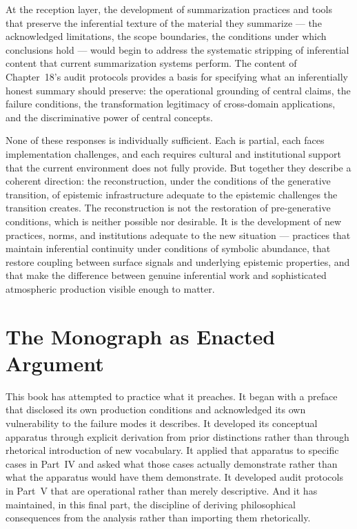 \documentclass[12pt, openright, twoside]{book}
\begin{document}
At the reception layer, the development of summarization practices
and tools that preserve the inferential texture of the material they
summarize --- the acknowledged limitations, the scope boundaries, the
conditions under which conclusions hold --- would begin to address the
systematic stripping of inferential content that current summarization
systems perform. The content of Chapter~18's audit protocols provides
a basis for specifying what an inferentially honest summary should
preserve: the operational grounding of central claims, the failure
conditions, the transformation legitimacy of cross-domain applications,
and the discriminative power of central concepts.

None of these responses is individually sufficient. Each is partial,
each faces implementation challenges, and each requires cultural and
institutional support that the current environment does not fully
provide. But together they describe a coherent direction: the
reconstruction, under the conditions of the generative transition,
of epistemic infrastructure adequate to the epistemic challenges
the transition creates. The reconstruction is not the restoration
of pre-generative conditions, which is neither possible nor desirable.
It is the development of new practices, norms, and institutions adequate
to the new situation --- practices that maintain inferential continuity
under conditions of symbolic abundance, that restore coupling between
surface signals and underlying epistemic properties, and that make
the difference between genuine inferential work and sophisticated
atmospheric production visible enough to matter.

\section{The Monograph as Enacted Argument}

This book has attempted to practice what it preaches. It began with
a preface that disclosed its own production conditions and acknowledged
its own vulnerability to the failure modes it describes. It developed
its conceptual apparatus through explicit derivation from prior
distinctions rather than through rhetorical introduction of new
vocabulary. It applied that apparatus to specific cases in Part~IV
and asked what those cases actually demonstrate rather than what the
apparatus would have them demonstrate. It developed audit protocols
in Part~V that are operational rather than merely descriptive. And
it has maintained, in this final part, the discipline of deriving
philosophical consequences from the analysis rather than importing
them rhetorically.
\end{document}

